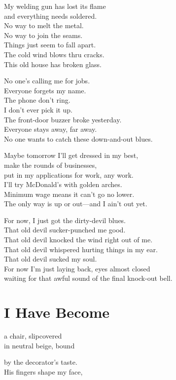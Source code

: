 \documentclass[twoside,10pt]{book}
\begin{document}
My welding gun has lost its flame\\
and everything needs soldered.\\
No way to melt the metal.\\
No way to join the seams.\\
Things just seem to fall apart.\\
The cold wind blows thru cracks.\\
This old house has broken glass.

No one's calling me for jobs.\\
Everyone forgets my name.\\
The phone don't ring.\\
I don't ever pick it up.\\
The front-door buzzer broke yesterday.\\
Everyone stays away, far away.\\
No one wants to catch these down-and-out blues.

Maybe tomorrow I'll get dressed in my best,\\
make the rounds of businesses,\\
put in my applications for work, any work.\\
I'll try McDonald's with golden arches.\\
Minimum wage means it can't go no lower.\\
The only way is up or out---and I ain't out yet.

For now, I just got the dirty-devil blues.\\
That old devil sucker-punched me good.\\
That old devil knocked the wind right out of me.\\
That old devil whispered hurting things in my ear.\\
That old devil sucked my soul.\\
For now I'm just laying back, eyes almost closed\\
waiting for that awful sound of the final knock-out bell.


\clearpage
\section{I Have Become}

a chair, slipcovered\\
in neutral beige, bound

by the decorator's taste.\\
His fingers shape my face,
\end{document}
